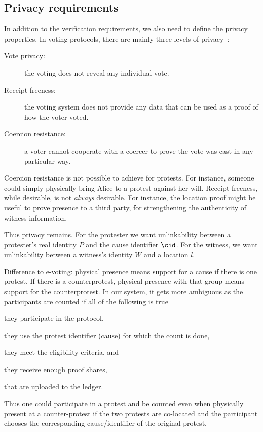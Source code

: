 \subsection{Privacy requirements}%
\label{privacy-properties}


In addition to the verification requirements, we also need to define the 
privacy properties.
In voting protocols, there are mainly three levels of 
privacy~\cite{VerifyingPrivacyPropertiesOfVotingProtocols}:
\begin{description}
  \item[Vote privacy:] the voting does not reveal any individual vote.
  \item[Receipt freeness:] the voting system does not provide any data that can 
    be used as a proof of how the voter voted.
  \item[Coercion resistance:] a voter cannot cooperate with a coercer to prove 
    the vote was cast in any particular way.
\end{description}

Coercion resistance is not possible to achieve for protests.
For instance, someone could simply physically bring Alice to a protest against 
her will.
Receipt freeness, while desirable, is not \emph{always} desirable.
For instance, the location proof might be useful to prove presence to a third 
party, \eg for strengthening the authenticity of witness information.

Thus privacy remains.
For the protester we want unlinkability between a protester's real identity 
\(P\) and the cause identifier \(\cid\).
For the witness, we want unlinkability between a witness's identity \(W\) and a 
location \(l\).


Difference to e-voting:
physical presence means support for a cause if there is one protest. If there is a counterprotest, physical presence with that group means support for the counterprotest. In our system, it gets more ambiguous as the participants are counted if all of the following is true
\begin{enumerate*}
\item they participate in the protocol,
\item they use the protest identifier (cause) for which the count is done,
\item they meet the eligibility criteria, and
\item they receive enough proof shares,
\item that are uploaded to the ledger.
\end{enumerate*}
Thus one could participate in a protest and be counted even when physically 
present at a counter-protest if the two protests are co-located and the 
participant chooses the corresponding cause/identifier of the original protest.

